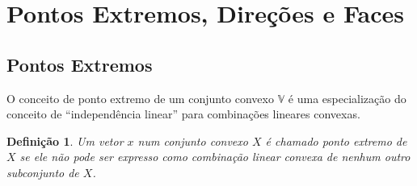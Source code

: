 \newtheorem{def:ponto extremo}[def:conjunto convexo]{Definição}

\newtheorem{def:hiperplano definidor}[def:conjunto convexo]{Definição}

\newtheorem{def:raio}[def:conjunto convexo]{Definição}

\newtheorem{def:direção}[def:conjunto convexo]{Definição}

\newtheorem{def:direção extrema}[def:conjunto convexo]{Definição}

\newtheorem{def:ponto degenerado}[def:conjunto convexo]{Definição}

\newtheorem{def:face}[def:conjunto convexo]{Definição}

\newtheorem{def:r face}[def:conjunto convexo]{Definição}

\newtheorem{def:dimensao face}[def:conjunto convexo]{Definição}


\newtheorem{prop:combinação convexa}{Proposição}[chapter]

\newtheorem{prop:hiperplano e ponto extremo}[prop:combinação convexa]{Proposição}

\newtheorem{prop:direção}[prop:combinação convexa]{Proposição}

\newtheorem{prop:aresta}[prop:combinação convexa]{Proposição}


\newtheorem{thm:ponto extremo}{Teorema}[chapter]

\section{Pontos Extremos, Direções e Faces}

\subsection{Pontos Extremos}

O conceito de ponto extremo de um conjunto convexo $\mathbb{V}$ é uma
especialização do conceito de ``independência linear'' para combinações
lineares convexas.

\begin{def:ponto extremo}
	Um vetor $x$ num conjunto convexo $X$ é chamado ponto extremo de
	$X$ se ele não pode ser expresso como combinação linear
	convexa de nenhum outro subconjunto de $X$.
\end{def:ponto extremo}

